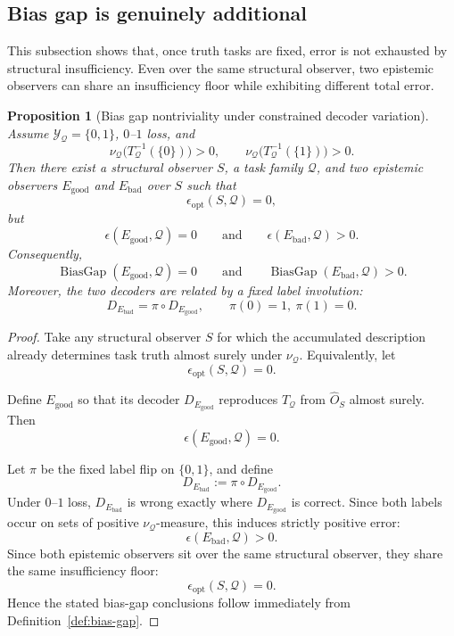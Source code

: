 \documentclass[11pt,twoside]{article}
\newtheorem{proposition}[theorem]{Proposition}
\theoremstyle{definition}
\newcommand{\good}{\mathrm{good}}
\newcommand{\bad}{\mathrm{bad}}
\DeclareMathOperator{\BiasGap}{BiasGap}
\begin{document}
\subsection{Bias gap is genuinely additional}
\label{subsec:bias-gap-nontrivial}

This subsection shows that, once truth tasks are fixed, error is not exhausted by structural insufficiency. Even over the same structural observer, two epistemic observers can share an insufficiency floor while exhibiting different total error.

\begin{proposition}[Bias gap nontriviality under constrained decoder variation]
\label{prop:bias-gap-nontrivial}
Assume \(\mathcal{Y}_{\mathcal{Q}}=\{0,1\}\), \(0\)--\(1\) loss, and
\[
  \nu_{\mathcal{Q}}\!\bigl(T_{\mathcal{Q}}^{-1}(\{0\})\bigr)>0,
  \qquad
  \nu_{\mathcal{Q}}\!\bigl(T_{\mathcal{Q}}^{-1}(\{1\})\bigr)>0.
\]
Then there exist a structural observer \(S\), a task family \(\mathcal{Q}\), and two epistemic observers \(E_{\good}\) and \(E_{\bad}\) over \(S\) such that
\[
  \epsilon_{\mathrm{opt}}(S,\mathcal{Q}) = 0,
\]
but
\[
  \epsilon(E_{\good},\mathcal{Q}) = 0
  \qquad\text{and}\qquad
  \epsilon(E_{\bad},\mathcal{Q}) > 0.
\]
Consequently,
\[
  \BiasGap(E_{\good},\mathcal{Q}) = 0
  \qquad\text{and}\qquad
  \BiasGap(E_{\bad},\mathcal{Q}) > 0.
\]
Moreover, the two decoders are related by a fixed label involution:
\[
  D_{E_{\bad}} = \pi \circ D_{E_{\good}},
  \qquad
  \pi(0)=1,\ \pi(1)=0.
\]
\end{proposition}

\begin{proof}
Take any structural observer \(S\) for which the accumulated description already determines task truth almost surely under \(\nu_{\mathcal{Q}}\). Equivalently, let
\[
  \epsilon_{\mathrm{opt}}(S,\mathcal{Q})=0.
\]

Define \(E_{\good}\) so that its decoder \(D_{E_{\good}}\) reproduces \(T_{\mathcal{Q}}\) from \(\widehat{O}_S\) almost surely. Then
\[
  \epsilon(E_{\good},\mathcal{Q})=0.
\]

Let \(\pi\) be the fixed label flip on \(\{0,1\}\), and define
\[
  D_{E_{\bad}} := \pi \circ D_{E_{\good}}.
\]
Under \(0\)--\(1\) loss, \(D_{E_{\bad}}\) is wrong exactly where \(D_{E_{\good}}\) is correct. Since both labels occur on sets of positive \(\nu_{\mathcal{Q}}\)-measure, this induces strictly positive error:
\[
  \epsilon(E_{\bad},\mathcal{Q})>0.
\]
Since both epistemic observers sit over the same structural observer, they share the same insufficiency floor:
\[
  \epsilon_{\mathrm{opt}}(S,\mathcal{Q})=0.
\]
Hence the stated bias-gap conclusions follow immediately from Definition~\ref{def:bias-gap}.
\end{proof}
\end{document}
